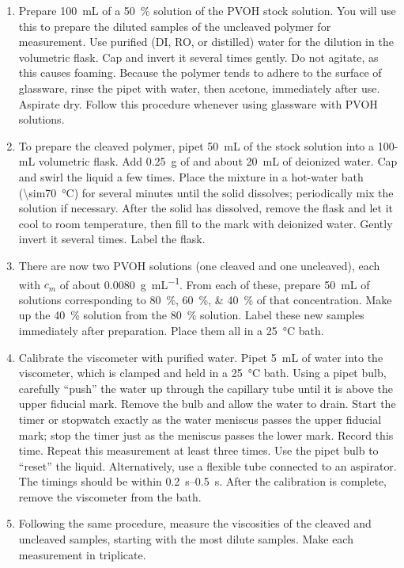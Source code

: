 \documentclass[nobib,nofonts,nols,nohyper]{tufte-handout}
\begin{document}
\begin{enumerate}
	\item Prepare \SI{100}{\mL} of a \SI{50}{\percent} solution of the PVOH stock solution. 
	You will use this to prepare the diluted samples of the uncleaved polymer for measurement. 
	Use purified (DI, RO, or distilled) water for the dilution in the volumetric flask. 
	Cap and invert it several times gently. 
	Do not agitate, as this causes foaming. 
	Because the polymer tends to adhere to the surface of glassware, rinse the pipet with water, then acetone, immediately after use. 
	Aspirate dry. 
	Follow this procedure whenever using glassware with PVOH solutions.
	\item To prepare the cleaved polymer, pipet \SI{50}{\mL} of the stock solution into a 100-mL volumetric flask. 
	Add \SI{0.25}{\g} of  and about \SI{20}{\mL} of deionized water. 
	Cap and swirl the liquid a few times. 
	Place the mixture in a hot-water bath (\SI{\sim70}{\celsius}) for several minutes until the solid dissolves; periodically mix the solution if necessary. 
	After the solid has dissolved, remove the flask and let it cool to room temperature, then fill to the mark with deionized water. 
	Gently invert it several times. Label the flask.
	\item There are now two PVOH solutions (one cleaved and one uncleaved), each with \( c_m \) of about \SI{0.0080}{\g \per \mL}. 
	From each of these, prepare \SI{50}{\mL} of solutions corresponding to \SIlist{80;60;40}{\percent} of that concentration. 
	Make up the \SI{40}{\percent} solution from the \SI{80}{\percent} solution. 
	Label these new samples immediately after preparation. 
	Place them all in a \SI{25}{\celsius} bath.
	\item Calibrate the viscometer with purified water. 
	Pipet \SI{5}{\mL} of water into the viscometer, which is clamped and held in a \SI{25}{\celsius} bath. 
	Using a pipet bulb, carefully ``push'' the water up through the capillary tube until it is above the upper fiducial mark. 
	Remove the bulb and allow the water to drain. 
	Start the timer or stopwatch exactly as the water meniscus passes the upper fiducial mark; stop the timer just as the meniscus passes the lower mark. 
	Record this time. Repeat this measurement at least three times. 
	Use the pipet bulb to ``reset'' the liquid. 
	Alternatively, use a flexible tube connected to an aspirator. 
	The timings should be within \SIrange{0.2}{0.5}{\s}. 
	After the calibration is complete, remove the viscometer from the bath.
	\item Following the same procedure, measure the viscosities of the cleaved and uncleaved samples, starting with the most dilute samples. 
	Make each measurement in triplicate.
\end{enumerate}
\end{document}
